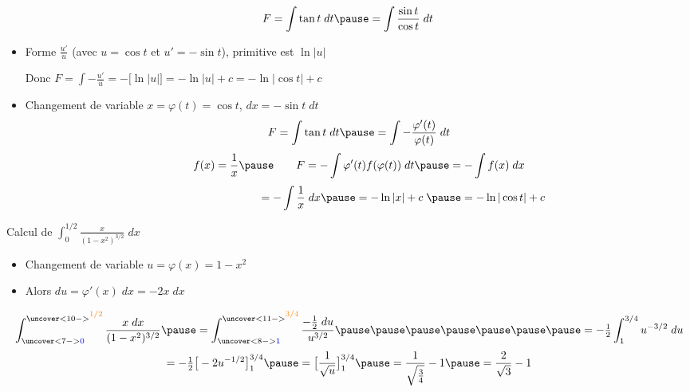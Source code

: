 \begin{frame}
\begin{exemple}
\[
F=\int \tan t \; dt \pause = \int \frac{\sin t}{\cos t} \; dt \;
\]
\pause
\begin{itemize}
  \item Forme $\frac{u'}{u}$ (avec $u=\cos t$ et $u'=-\sin t$), \pause primitive est $\ln|u|$

\pause

Donc $F = \int -\frac{u'}{u} = -\big[\ln |u| \big] = -\ln|u|+c = -\ln|\cos t|+c$


\pause

  \item Changement de variable $x = \varphi(t)= \cos t$, \pause $dx = -\sin t \; dt$
\pause
$$
F = \int \tan t \; dt \pause = \int -\frac{\varphi'(t)}{\varphi(t)} \; dt
$$
\pause
$$f(x)=\frac1x \pause \qquad F = - \int \varphi'(t) f(\varphi(t))\; dt \pause = -\int f(x) \; dx$$
\pause
 $$\qquad\qquad\qquad\qquad=-\int \frac1x \;dx \pause = -\ln|x|+c \; \pause = -\ln|\cos t| + c$$
\end{itemize}
\end{exemple}
\end{frame}



\begin{frame}
\begin{exemple}

\hfil\hfil Calcul de $\displaystyle \int_0^{1/2}\frac{x}{(1-x^2)^{3/2}} \;dx$

\pause

\begin{itemize}
  \item Changement de variable $u=\varphi(x) = 1-x^2$
\pause 
  \item Alors $du = \varphi'(x) \; dx = -2x \; dx$



\end{itemize}

\pause
$$\int_{\uncover<7->{\textcolor{blue}{0}}}^{\uncover<10->{\raise1ex\hbox{\scriptsize \textcolor{orange}{1/2}}}}\frac{x \; dx}{(1-x^2)^{3/2}} 
\pause= \int_{\uncover<8->{\textcolor{blue}{1}}}^{\uncover<11->{\raise1ex\hbox{\scriptsize \textcolor{orange}{3/4}}}} \frac{-\tfrac12 \; du}{u^{3/2}} 
\pause\pause\pause\pause\pause\pause\pause = -\tfrac12\int_1^{3/4} u^{-3/2}\;du$$
\pause 
$$
= -\tfrac12\big[-2u^{-1/2}\big]_1^{3/4}
\pause
=\big[\frac1{\sqrt{u}}\big]_1^{3/4} \pause = \frac1{\sqrt{\frac34}}-1\pause = \frac{2}{\sqrt3}-1$$
\end{exemple}
\end{frame}


